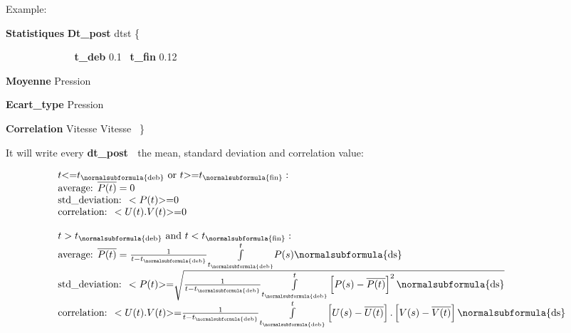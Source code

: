 
\bigskip

Example:

\textbf{Statistiques}\textbf{ Dt\_post}\textbf{ }dtst \{

\textbf{\ \ \ \ \ \ \ \ \ \ \ \ t\_deb} 0.1 \ \textbf{t\_fin} 0.12

\textbf{Moyenne} Pression

\textbf{Ecart\_type}\textbf{ }Pression 

\textbf{Correlation}\textbf{ }Vitesse Vitesse \ \}

It will write every \textbf{dt\_post \ }the mean, standard deviation and correlation value:

\begin{equation*}
\begin{matrix}t\text{{\textless}=}t_{\normalsubformula{\text{deb}}}\text{ or }t\text{{\textgreater}=}t_{\normalsubformula{\text{fin}}}:\hfill\null \\\text{average:
}\overline{P(t)}=0\hfill\null \\\text{std\_deviation: }<P(t)\text{{\textgreater}=}0\hfill\null \\\text{correlation:
}<U(t).V(t)\text{{\textgreater}=0}\hfill\null \\\text{ }\hfill\null \\t>t_{\normalsubformula{\text{deb}}}\text{ and }t<t_{\normalsubformula{\text{fin}}}:\hfill\null
\\\text{average: }\overline{P(t)}=\frac 1{t-t_{\normalsubformula{\text{deb}}}}\overset
t{\underset{t_{\normalsubformula{\text{deb}}}}{\int }}P(s)\normalsubformula{\text{ds}}\hfill\null
\\\text{std\_deviation: }<P(t)\text{{\textgreater}=}\sqrt{\frac 1{t-t_{\normalsubformula{\text{deb}}}}\overset
t{\underset{t_{\normalsubformula{\text{deb}}}}{\int
}}\left[P(s)-\overline{P(t)}\right]^2\normalsubformula{\text{ds}}}\hfill\null \\\text{correlation:
}<U(t).V(t)\text{{\textgreater}=}\frac 1{t-t_{\normalsubformula{\text{deb}}}}\overset
t{\underset{t_{\normalsubformula{\text{deb}}}}{\int
}}\left[U(s)-\overline{U(t)}\right].\left[V(s)-\overline{V(t)}\right]\normalsubformula{\text{ds}}\hfill\null
\end{matrix}\hfill 
\end{equation*}
